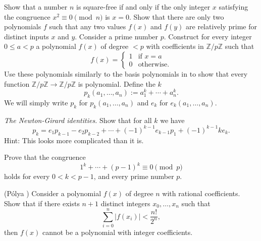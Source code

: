\begin{routine}
  \exercise Show that a number $n$ is square-free if and only if the only integer $x$ satisfying the congruence $x^2\equiv 0\pmod{n}$ is $x=0$.
  \exercise Show that there are only two polynomials $f$ such that any two values $f(x)$ and $f(y)$ are relatively prime for distinct inputs $x$ and $y$.
  \exercise Consider a prime number $p$. Construct for every integer $0\leq a < p$ a polynomial $f(x)$ of degree $<p$ with coefficients in $\mathbb{Z}/p\mathbb{Z}$ such that
  \begin{equation*}
    f(x)=
    \begin{cases}
      1 & \text{if }x=a\\
      0 & \text{otherwise.}
    \end{cases}
  \end{equation*}
  Use these polynomials similarly to the basis polynomials in  to show that every function $\mathbb{Z}/p\mathbb{Z}\to \mathbb{Z}/p\mathbb{Z}$ is polynomial.
  \exercise Define the $k$\supth{} 
  \begin{equation*}
    p_k(a_1,\ldots,a_n) := a_1^k + \cdots + a_n^k.
  \end{equation*}
  We will simply write $p_k$ for $p_k(a_1,\ldots,a_n)$ and $e_k$ for $e_k(a_1,\ldots,a_n)$.
  \begin{subexenum}
  \item \emph{The Newton-Girard identities.} Show that for all $k$ we have
    \begin{equation*}
      p_k = e_1p_{k-1}-e_2p_{k-2}+\cdots +(-1)^{k-1}e_{k-1}p_1 + (-1)^{k-1}ke_k.
    \end{equation*}
    Hint: This looks more complicated than it is.
  \item Prove that the congruence
    \begin{equation*}
      1^k+\cdots + (p-1)^k \equiv 0 \pmod{p}
    \end{equation*}
    holds for every $0< k <p-1$, and every prime number $p$.
  \end{subexenum}
\end{routine}

\begin{challenge}
  \exercise (P\'{o}lya \cite{polya1919}) Consider a polynomial $f(x)$ of degree $n$ with rational coefficients. Show that if there exists $n+1$ distinct integers $x_0,\ldots,x_n$ such that
  \begin{equation*}
    \sum_{i=0}^n |f(x_i)|<\frac{n!}{2^n},
  \end{equation*}
  then $f(x)$ cannot be a polynomial with integer coefficients.
\end{challenge}


